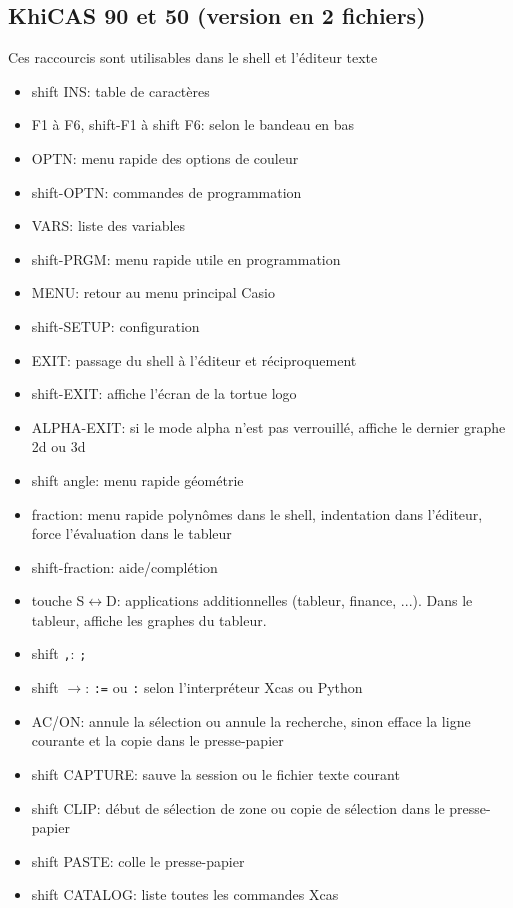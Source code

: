 \documentclass{article}
\begin{document}
\begin{giacjshere}
\subsection{KhiCAS 90 et 50 (version en 2 fichiers)}
Ces raccourcis sont utilisables dans le shell et l'\'editeur texte
\begin{itemize}
  \item shift INS: table de caractères
\item F1 \`a F6, shift-F1 \`a shift F6: selon le bandeau en bas
\item OPTN: menu rapide des options de couleur
\item shift-OPTN: commandes de programmation
\item VARS: liste des variables
\item shift-PRGM: menu rapide utile en programmation
\item MENU: retour au menu principal Casio
\item shift-SETUP: configuration
\item EXIT: passage du shell \`a l'\'editeur et r\'eciproquement
\item shift-EXIT: affiche l'\'ecran de la tortue logo
\item ALPHA-EXIT: si le mode alpha n'est pas verrouill\'e, affiche le dernier graphe 2d ou 3d
\item shift angle: menu rapide g\'eom\'etrie 
\item fraction: menu rapide polyn\^omes dans le shell, indentation
  dans   l'\'editeur, force l'\'evaluation dans le tableur
\item shift-fraction: aide/compl\'etion
\item touche S$\leftrightarrow$D: applications additionnelles
  (tableur, finance, ...). Dans le tableur, affiche les graphes du tableur.
\item shift \verb|,|: \verb|;|
\item shift $\rightarrow$: \verb|:=| ou \verb|:| selon l'interpr\'eteur
  Xcas ou Python
\item AC/ON: annule la s\'election ou annule la recherche, sinon
efface la ligne courante et la copie dans le presse-papier
\item shift CAPTURE: sauve la session ou le fichier texte courant
\item shift CLIP: d\'ebut de s\'election de zone ou copie de
  s\'election dans le presse-papier
\item shift PASTE: colle le presse-papier
\item shift CATALOG: liste toutes les commandes Xcas

\end{itemize}
\end{giacjshere}
\end{document}

